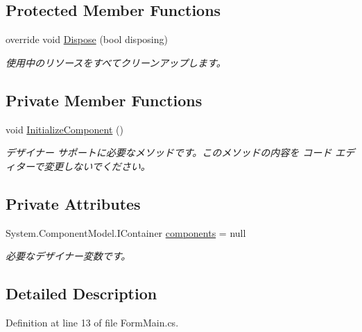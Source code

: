 \subsection*{Protected Member Functions}
\begin{DoxyCompactItemize}
\item 
override void \hyperlink{class_reversi_form_1_1_reversi_ac021c14c28e588c11445e460ec7e87d1}{Dispose} (bool disposing)
\begin{DoxyCompactList}\small\item\em 使用中のリソースをすべてクリーンアップします。 \end{DoxyCompactList}\end{DoxyCompactItemize}
\subsection*{Private Member Functions}
\begin{DoxyCompactItemize}
\item 
void \hyperlink{class_reversi_form_1_1_reversi_abec0816dd006d05b512d86b45a20af68}{Initialize\+Component} ()
\begin{DoxyCompactList}\small\item\em デザイナー サポートに必要なメソッドです。このメソッドの内容を コード エディターで変更しないでください。 \end{DoxyCompactList}\end{DoxyCompactItemize}
\subsection*{Private Attributes}
\begin{DoxyCompactItemize}
\item 
System.\+Component\+Model.\+I\+Container \hyperlink{class_reversi_form_1_1_reversi_a2edc9ab9401997c20553b26aadef1ea0}{components} = null
\begin{DoxyCompactList}\small\item\em 必要なデザイナー変数です。 \end{DoxyCompactList}\end{DoxyCompactItemize}


\subsection{Detailed Description}


Definition at line 13 of file Form\+Main.\+cs.



